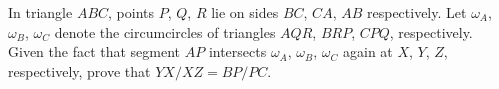 In triangle $ABC$,  points $P$,  $Q$,  $R$ lie on sides $BC$,  $CA$,  $AB$ respectively.  Let $\omega_A$,  $\omega_B$,  $\omega_C$ denote the circumcircles of triangles $AQR$,  $BRP$,  $CPQ$,  respectively.  Given the fact that segment $AP$ intersects $\omega_A$,  $\omega_B$,  $\omega_C$ again at $X$,  $Y$,  $Z$,  respectively, prove that $YX/XZ=BP/PC$.